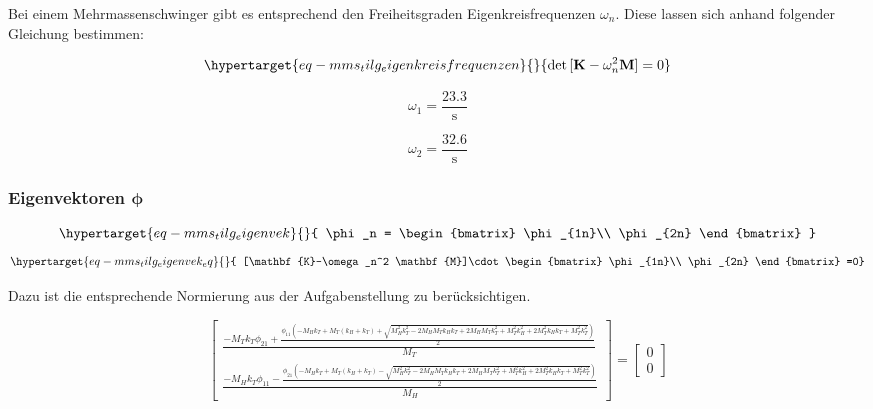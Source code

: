 \documentclass[
  letterpaper,
  DIV=11]{scrreprt}
\begin{document}
Bei einem Mehrmassenschwinger gibt es entsprechend den Freiheitsgraden
Eigenkreisfrequenzen \(\omega_n\). Diese lassen sich anhand folgender
Gleichung bestimmen:

\begin{equation}\protect\hypertarget{eq-mms_tilg_eigenkreisfrequenzen}{}{
\det{[\mathbf{K}-\omega_n^2 \mathbf{M}]=0}
}\label{eq-mms_tilg_eigenkreisfrequenzen}\end{equation}

\begin{equation}\omega_{1} = \frac{23.3}{\text{s}}\end{equation}

\begin{equation}\omega_{2} = \frac{32.6}{\text{s}}\end{equation}

\hypertarget{eigenvektoren-mathbfphi}{%
\subsubsection{\texorpdfstring{Eigenvektoren
\(\mathbf{\phi}\)}{Eigenvektoren \textbackslash mathbf\{\textbackslash phi\}}}\label{eigenvektoren-mathbfphi}}

\begin{equation}\protect\hypertarget{eq-mms_tilg_eigenvek}{}{
\phi_n = \begin{bmatrix}
\phi_{1n}\\
\phi_{2n} 
\end{bmatrix}
}\label{eq-mms_tilg_eigenvek}\end{equation}
\begin{equation}\protect\hypertarget{eq-mms_tilg_eigenvek_eq}{}{
[\mathbf{K}-\omega_n^2 \mathbf{M}]\cdot \begin{bmatrix}
\phi_{1n}\\
\phi_{2n} 
\end{bmatrix}
=0}\label{eq-mms_tilg_eigenvek_eq}\end{equation}

Dazu ist die entsprechende Normierung aus der Aufgabenstellung zu
berücksichtigen.

\begin{equation}\left[\begin{matrix}\frac{- M_{T} k_{T} \phi_{21} + \frac{\phi_{11} \left(- M_{H} k_{T} + M_{T} \left(k_{H} + k_{T}\right) + \sqrt{M_{H}^{2} k_{T}^{2} - 2 M_{H} M_{T} k_{H} k_{T} + 2 M_{H} M_{T} k_{T}^{2} + M_{T}^{2} k_{H}^{2} + 2 M_{T}^{2} k_{H} k_{T} + M_{T}^{2} k_{T}^{2}}\right)}{2}}{M_{T}}\\\frac{- M_{H} k_{T} \phi_{11} - \frac{\phi_{21} \left(- M_{H} k_{T} + M_{T} \left(k_{H} + k_{T}\right) - \sqrt{M_{H}^{2} k_{T}^{2} - 2 M_{H} M_{T} k_{H} k_{T} + 2 M_{H} M_{T} k_{T}^{2} + M_{T}^{2} k_{H}^{2} + 2 M_{T}^{2} k_{H} k_{T} + M_{T}^{2} k_{T}^{2}}\right)}{2}}{M_{H}}\end{matrix}\right] = \left[\begin{matrix}0\\0\end{matrix}\right]\end{equation}
\end{document}
